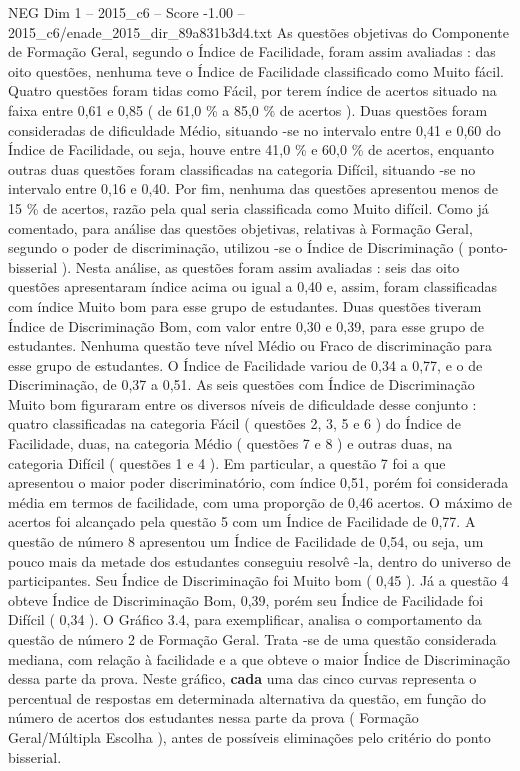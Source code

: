 \begin{textsample}{NEG Dim 1 – 2015\_c6 – Score -1.00 – 2015\_c6/enade\_2015\_dir\_89a831b3d4.txt}
As questões objetivas do Componente de Formação Geral, segundo o Índice de Facilidade, foram assim avaliadas : das oito questões, nenhuma teve o Índice de Facilidade classificado como Muito fácil.
Quatro questões foram tidas como Fácil, por terem índice de acertos situado na faixa entre 0,61 e 0,85 ( de 61,0 \% a 85,0 \% de acertos ).
Duas questões foram consideradas de dificuldade Médio, situando -se no intervalo entre 0,41 e 0,60 do Índice de Facilidade, ou seja, houve entre 41,0 \% e 60,0 \% de acertos, enquanto outras duas questões foram classificadas na categoria Difícil, situando -se no intervalo entre 0,16 e 0,40.
Por fim, nenhuma das questões apresentou menos de 15 \% de acertos, razão pela qual seria classificada como Muito difícil.
Como já comentado, para análise das questões objetivas, relativas à Formação Geral, segundo o poder de discriminação, utilizou -se o Índice de Discriminação ( ponto- bisserial ).
Nesta análise, as questões foram assim avaliadas : seis das oito questões apresentaram índice acima ou igual a 0,40 e, assim, foram classificadas com índice Muito bom para esse grupo de estudantes.
Duas questões tiveram Índice de Discriminação Bom, com valor entre 0,30 e 0,39, para esse grupo de estudantes.
Nenhuma questão teve nível Médio ou Fraco de discriminação para esse grupo de estudantes.
O Índice de Facilidade variou de 0,34 a 0,77, e o de Discriminação, de 0,37 a 0,51.
As seis questões com Índice de Discriminação Muito bom figuraram entre os diversos níveis de dificuldade desse conjunto : quatro classificadas na categoria Fácil ( questões 2, 3, 5 e 6 ) do Índice de Facilidade, duas, na categoria Médio ( questões 7 e 8 ) e outras duas, na categoria Difícil ( questões 1 e 4 ).
Em particular, a questão 7 foi a que apresentou o maior poder discriminatório, com índice 0,51, porém foi considerada média em termos de facilidade, com uma proporção de 0,46 acertos.
O máximo de acertos foi alcançado pela questão 5 com um Índice de Facilidade de 0,77.
A questão de número 8 apresentou um Índice de Facilidade de 0,54, ou seja, um pouco mais da metade dos estudantes conseguiu resolvê -la, dentro do universo de participantes.
Seu Índice de Discriminação foi Muito bom ( 0,45 ).
Já a questão 4 obteve Índice de Discriminação Bom, 0,39, porém seu Índice de Facilidade foi Difícil ( 0,34 ).
O Gráfico 3.4, para exemplificar, analisa o comportamento da questão de número 2 de Formação Geral.
Trata -se de uma questão considerada mediana, com relação à facilidade e a que obteve o maior Índice de Discriminação dessa parte da prova.
Neste gráfico, \textbf{cada} uma das cinco curvas representa o percentual de respostas em determinada alternativa da questão, em função do número de acertos dos estudantes nessa parte da prova ( Formação Geral/Múltipla Escolha ), antes de possíveis eliminações pelo critério do ponto bisserial.

\end{textsample}
